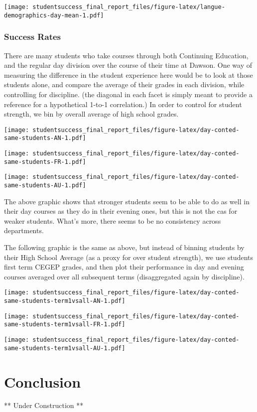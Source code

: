 \documentclass[]{book}
\theoremstyle{definition}
\theoremstyle{definition}
\theoremstyle{remark}
\begin{document}
\texttt{[image: studentsuccess\_final\_report\_files/figure-latex/langue-demographics-day-mean-1.pdf]}

\subsection{Success Rates}\label{success-rates}

There are many students who take courses through both Continuing
Education, and the regular day division over the course of their time at
Dawson. One way of measuring the difference in the student experience
here would be to look at those students alone, and compare the average
of their grades in each division, while controlling for discipline. (the
diagonal in each facet is simply meant to provide a reference for a
hypothetical 1-to-1 correlation.) In order to control for student
strength, we bin by overall average of high school grades.

\texttt{[image: studentsuccess\_final\_report\_files/figure-latex/day-conted-same-students-AN-1.pdf]}

\texttt{[image: studentsuccess\_final\_report\_files/figure-latex/day-conted-same-students-FR-1.pdf]}

\texttt{[image: studentsuccess\_final\_report\_files/figure-latex/day-conted-same-students-AU-1.pdf]}

The above graphic shows that stronger students seem to be able to do as
well in their day courses as they do in their evening ones, but this is
not the cas for weaker students. What's more, there seems to be no
consistency across departments.

The following graphic is the same as above, but instead of binning
students by their High School Average (as a proxy for over student
strength), we use students first term CEGEP grades, and then plot their
performance in day and evening courses averaged over all subsequent
terms (disaggregated again by discipline).

\texttt{[image: studentsuccess\_final\_report\_files/figure-latex/day-conted-same-students-term1vsall-AN-1.pdf]}

\texttt{[image: studentsuccess\_final\_report\_files/figure-latex/day-conted-same-students-term1vsall-FR-1.pdf]}

\texttt{[image: studentsuccess\_final\_report\_files/figure-latex/day-conted-same-students-term1vsall-AU-1.pdf]}

\hypertarget{conclusion}{\chapter{Conclusion}\label{conclusion}}

** Under Construction **


\end{document}

